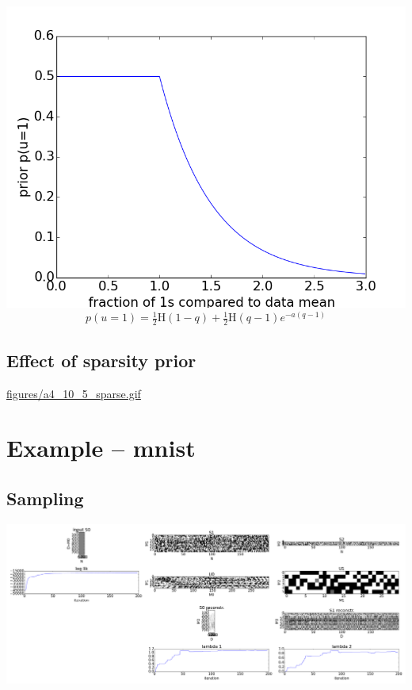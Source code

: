 \documentclass[11pt]{article}
\begin{document}
\includegraphics[width=.9\linewidth]{figures/prior.png}
$$  p(u = 1) = \tfrac{1}{2} \mathrm{H}( 1 - q ) + \tfrac{1}{2} \mathrm{H}(q-1) e^{-a(q-1)} $$

\subsection*{Effect of sparsity prior}
\label{sec-6-1}
\url{figures/a4_10_5_sparse.gif}

\section*{Example -- mnist}
\label{sec-7}
\subsection*{Sampling}
\label{sec-7-1}
\includegraphics[width=.9\linewidth]{figures/mnist_sampler.png}
\end{document}
